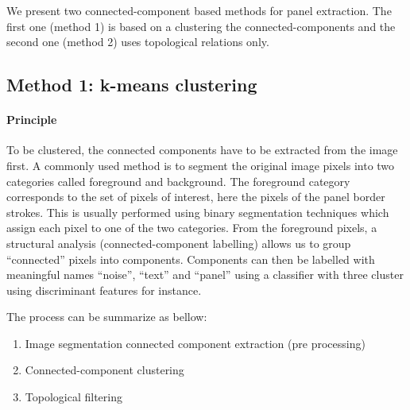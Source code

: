 We present two connected-component based methods for panel extraction.
The first one (method 1) is based on a clustering the connected-components and the second one (method 2) uses topological relations only.


\subsection{Method 1: k-means clustering} %
\label{sub:k_mean_clustering}

\paragraph{Principle} %
\label{par:principle}

To be clustered, the connected components have to be extracted from the image first.
A commonly used method is to segment the original image pixels into two categories called foreground and background.
The foreground category corresponds to the set of pixels of interest, here the pixels of the panel border strokes.
This is usually performed using binary segmentation techniques which assign each pixel to one of the two categories.
From the foreground pixels, a structural analysis (connected-component labelling) allows us to group ``connected'' pixels into components.
Components can then be labelled with meaningful names ``noise'', ``text'' and ``panel'' using a classifier with three cluster using discriminant features for instance.

The process can be summarize as bellow:
  \begin{enumerate}
	\item Image segmentation connected component extraction (pre processing)
	\item Connected-component clustering
	\item Topological filtering
  \end{enumerate}


